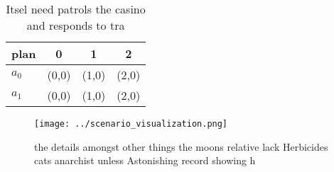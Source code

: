 \documentclass[a4paper]{article}
\begin{document}
\begin{table}
\begin{adjustbox}{width=0.6\columnwidth}
\begin{tabular}{|l|l|l|l|}
\hline
\textbf{plan} & \multicolumn{1}{c|}{\textbf{0}} & \multicolumn{1}{c|}{\textbf{1}} & \multicolumn{1}{c|}{\textbf{2}} \\ \hline
\textbf{$a_0$}  & (0,0) & (1,0) & (2,0) \\ \hline
\textbf{$a_1$}  & (0,0) & (1,0) & (2,0) \\ \hline
\end{tabular}
\end{adjustbox}
\caption{Itsel need patrols the casino and responds to tra
}
\end{table}

\begin{figure}
\centering
\texttt{[image: ../scenario\_visualization.png]}
\caption{ the details amongst other things the moons relative lack Herbicides cats anarchist unless Astonishing record showing h
}
\end{figure}
 
\end{document}
